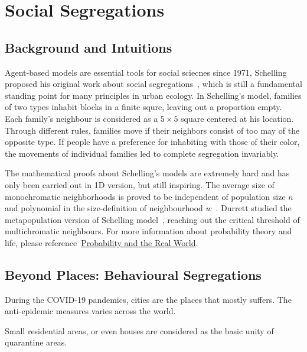 \chapter{Social Segregations}

\section{Background and Intuitions}

Agent-based models are essential tools for social sciecnes since 1971, Schelling proposed his original work about social segregations~\cite{schelling1971dynamic}, which is still a fundamental standing point for many principles in urban ecology. In Schelling's model, families of two types inhabit blocks in a finite squre, leaving out a proportion empty. Each family's neighbour is considered as a $5\times 5$ square centered at his location. Through different rules, families move if their neighbors consist of too may of the opposite type. If people have a preference for inhabiting with those of their color, the movements of individual families led to complete segregation invariably. 

The mathematical proofs about Schelling's models are extremely hard and has only been carried out in 1D version, but still inspiring. The average size of monochromatic neighborhoods is proved to be independent of population size $n$ and polynomial in the size-definition of neighbourhood $w$~\cite{schelling1971dynamic}. Durrett studied the metapopulation version of Schelling model~\cite{durrett2014exact}, reaching out the critical threshold of multichromatic neighbours. For more information about probability theory and life, please reference~\href{https://www.stat.berkeley.edu/~aldous/157/}{Probability and the Real World}.


\section{Beyond Places: Behavioural Segregations}

During the COVID-19 pandemics, cities are the places that mostly suffers. The anti-epidemic measures varies across the world. 

Small residential areas, or even houses are considered as the basic unity of quarantine areas. 